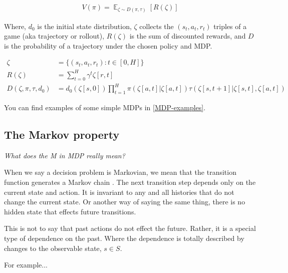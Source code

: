 \begin{align*}
V(\pi) = \mathop{\mathbb E}_{\zeta \sim D(\pi, \tau)} [R(\zeta)]
\end{align*}


Where, $d_0$ is the initial state distribution, $\zeta$ collects the $(s_t, a_t, r_t)$ triples of a game (aka trajectory or rollout),
$R(\zeta)$ is the sum of discounted rewards, and $D$ is the probability of a trajectory under the chosen policy and MDP.

\begin{align}
\zeta &= \{(s_t, a_t, r_t) : t \in [0, H]\} \tag{trajectory} \\
R(\zeta) &=\sum_{t=0}^H \gamma^t \zeta[r, t] \tag{Return} \\
D(\zeta, \pi, \tau, d_0) &= d_0(\zeta[s, 0]) \prod_{t=1}^{H} \pi(\zeta[a, t]|\zeta[a, t]) \tau(\zeta[s, t+1]|\zeta[s, t], \zeta[a, t]) \tag{p(traj)}
\end{align}


You can find examples of some simple MDPs in \ref{MDP-examples}.

\subsection{The Markov property}

\begin{displayquote}
  \textit{What does the M in MDP really mean?}
\end{displayquote}

When we say a decision problem is Markovian, we mean that the transition
function generates a Markov chain \cite{Markov2006}. The next transition step depends only
on the current state and action. It is invariant to any and all histories that do not
change the current state. Or another way of saying the same thing, there is no hidden state
that effects future transitions.

This is not to say that past actions do not effect the future. Rather,
it is a special type of dependence on the past. Where the dependence is
totally described by changes to the observable state, $s\in S$.

{\color{red}For example...}


